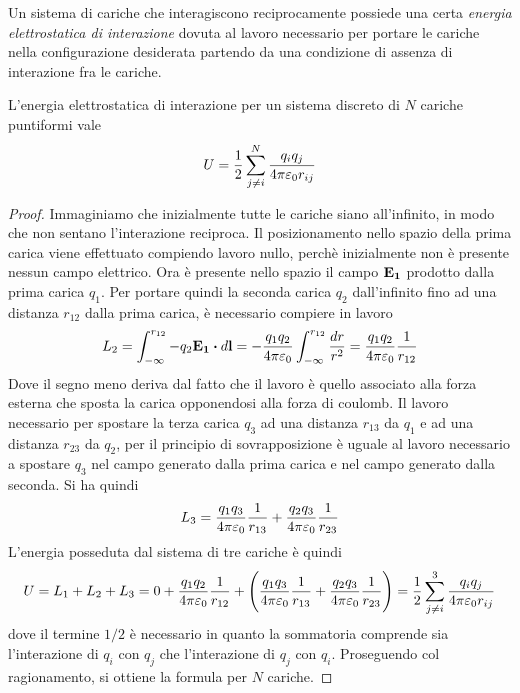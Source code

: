 Un sistema di cariche che interagiscono reciprocamente possiede una certa \textit{energia elettrostatica di interazione}
dovuta al lavoro necessario per portare le cariche nella configurazione
desiderata partendo da una condizione di assenza di interazione fra le cariche.\\
\begin{thm}
    L'energia elettrostatica di interazione per un sistema discreto di $N$ cariche puntiformi vale
    \begin{equation}
        \label{eqn:UE_puntiformi}
        U=\frac{1}{2}\sum_{j\neq i}^N\frac{q_iq_j}{4\pi\varepsilon_0 r_{ij}}
    \end{equation}
\end{thm}
\begin{proof}
    Immaginiamo che inizialmente tutte le cariche siano all'infinito, in modo che non sentano
    l'interazione reciproca. Il posizionamento nello spazio della prima carica viene effettuato compiendo lavoro nullo,
    perchè inizialmente non è presente nessun campo elettrico.
    Ora è presente nello spazio il campo $\vb{E_1}$ prodotto dalla prima carica $q_1$.
    Per portare quindi la seconda carica $q_2$ dall'infinito fino ad una distanza $r_{12}$ dalla prima carica, è necessario compiere in lavoro
    \[
        L_2=\int_{-\infty}^{r_{12}}-q_2\vb{E_1}\vdot d\vb{l}=-\frac{q_1q_2}{4\pi\epsilon_0}\int_{-\infty}^{r_{12}}\frac{dr}{r^2}
        =\frac{q_1q_2}{4\pi\epsilon_0}\rec{r_{12}}
    \]
    Dove il segno meno deriva dal fatto che il lavoro è quello associato alla forza esterna che
    sposta la carica opponendosi alla forza di coulomb.
    Il lavoro necessario per spostare la terza carica $q_3$ ad una distanza $r_{13}$ da $q_1$
    e ad una distanza $r_{23}$ da $q_2$,  per il principio di sovrapposizione è uguale al lavoro necessario
    a spostare $q_3$ nel campo generato dalla prima carica e nel campo generato dalla seconda. Si ha quindi
    \[
        L_3=\frac{q_1q_3}{4\pi\varepsilon_0}\frac{1}{r_{13}}+\frac{q_2q_3}{4\pi\varepsilon_0}\frac{1}{r_{23}}
    \]
    L'energia posseduta dal sistema di tre cariche è quindi
    \[
        U=L_1+L_2+L_3=0+\frac{q_1q_2}{4\pi\varepsilon_0}\frac{1}{r_{12}}+\Biggl(\frac{q_1q_3}{4\pi\varepsilon_0}\frac{1}{r_{13}}
        +\frac{q_2q_3}{4\pi\varepsilon_0}\frac{1}{r_{23}}\Biggr)=\frac{1}{2}\sum_{j\neq i}^3\frac{q_iq_j}{4\pi\varepsilon_0 r_{ij}}
    \]
    dove il termine $1/2$ è necessario in quanto la sommatoria comprende sia l'interazione di $q_i$ con $q_j$
    che l'interazione di $q_j$ con $q_i$. Proseguendo col ragionamento, si ottiene la formula per $N$ cariche.
\end{proof}
